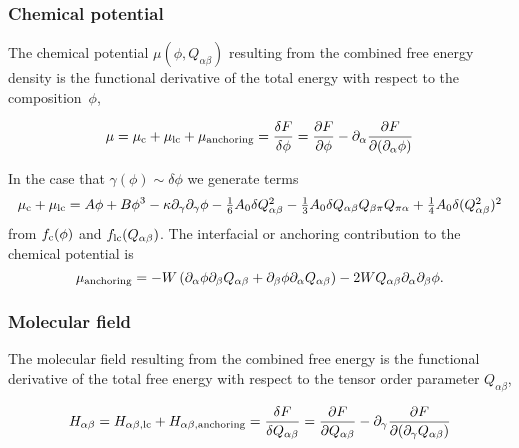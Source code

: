 \subsubsection{Chemical potential}

The chemical potential $\mu(\phi,Q_{\alpha\beta})$ resulting from the
combined free energy density is the functional derivative of the
total energy with respect to the composition~$\phi$, 

\begin{equation}
\mu = \mu_{\rm c} + \mu_{\rm lc} + \mu_{\rm anchoring} = \frac{\delta F}{\delta \phi} 
= \frac{\partial F}{\partial \phi} - \partial_\alpha \frac{\partial F}{\partial (\partial_\alpha \phi)}  
\end{equation}

In the
case that $\gamma(\phi) \sim \delta\phi$ we generate terms
\begin{equation}
\mu_{\rm c} + \mu_{\rm lc} = A\phi + B\phi^3 -\kappa \partial_{\gamma}\partial_{\gamma}\phi
- \textstyle{\frac{1}{6}} A_0 \delta Q_{\alpha\beta}^2
- \textstyle{\frac{1}{3}} A_0 \delta
                          Q_{\alpha\beta} Q_{\beta\pi} Q_{\pi\alpha}
+ \textstyle{\frac{1}{4}} A_0 \delta (Q_{\alpha\beta}^2)^2
\end{equation}
from $f_{\rm c}(\phi)$ and $f_{\rm lc}(Q_{\alpha\beta})$.
The interfacial or anchoring contribution to the chemical potential is
\begin{equation} 
\mu_{\rm anchoring}=-W \left(
 \partial_{\alpha}\phi\partial_{\beta}Q_{\alpha\beta}
+\partial_{\beta}\phi\partial_{\alpha}Q_{\alpha\beta}\right)
- 2W Q_{\alpha\beta} \partial_\alpha\partial_\beta\phi.
\end{equation}

\subsubsection{Molecular field}

The molecular field resulting from the combined free energy is the functional
derivative of the total free energy with respect to the tensor order parameter $Q_{\alpha\beta}$,

\begin{equation}
H_{\alpha\beta} = H_{\alpha\beta,{\rm lc}} + H_{\alpha\beta, {\rm anchoring}}  = \frac{\delta F}{\delta Q_{\alpha\beta}} 
= \frac{\partial F}{\partial Q_{\alpha\beta}} - \partial_\gamma \frac{\partial F}{\partial (\partial_\gamma Q_{\alpha\beta})}  
\end{equation}

